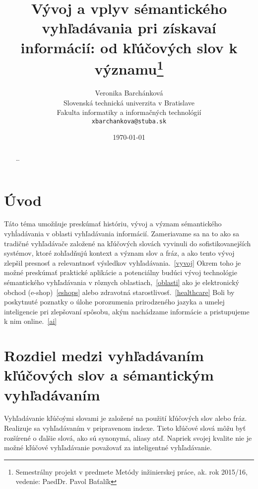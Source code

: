 \documentclass[10pt,twoside,slovak,a4paper]{article}
\title{Vývoj a vplyv sémantického vyhľadávania pri získavaí informácií:
od kľúčových slov k významu\thanks{Semestrálny projekt v predmete Metódy inžinierskej práce, ak. rok 2015/16, vedenie: PaedDr. Pavol Baťalík}} %
\author{Veronika Barchánková\\[2pt]
	{\small Slovenská technická univerzita v Bratislave}\\
	{\small Fakulta informatiky a informačných technológií}\\
	{\small \texttt{xbarchankova@stuba.sk}}
	}
\date{\small{\today}} %
\begin{document}
\maketitle

\begin{abstract}
\ldots
\end{abstract}



\section{Úvod}

Táto téma umožňuje preskúmať históriu, vývoj a význam sémantického vyhĺadávania v oblasti vyhľadávania
informácií.
Zameriavame sa na to ako sa tradičné vyhľadávače založené na kľúčových slovách vyvinuli do sofistikovanejších systémov, ktoré zohľadňujú kontext a význam slov a fráz, a ako tento vývoj zlepšil presnosť a
relevantnosť výsledkov vyhľadávania.~\ref{vyvoj}
Okrem toho je možné preskúmať praktické aplikácie a potenciálny budúci vývoj technológie sémantického
vyhľadávania v rôznych oblastiach,~\ref{oblasti} ako je elektronický obchod (e-shop)~\ref{eshops} alebo zdravotná starostlivosť.~\ref{healthcare}
Boli by poskytnuté poznatky o úlohe porozumenia prirodzeného jazyka a umelej inteligencie pri zlepšovaní
spôsobu, akým nachádzame informácie a pristupujeme k nim online.~\ref{ai}




\section{Rozdiel medzi vyhľadávaním kľúčových slov a sémantickým vyhľadávaním}\label{rozdiel}
\cite{5423739} Vyhľadávanie kľúčoými slovami je založené na použití kľúčových slov alebo fráz. Realizuje sa vyhľadávaním v pripravenom indexe. Tieto kľúčové slová môžu byť rozšírené o ďalšie slová, ako sú synonymá, aliasy atď. Napriek svojej kvalite nie je možné kľúčové vyhľadávanie považovať za inteligentné vyhľadávanie.
\end{document}
